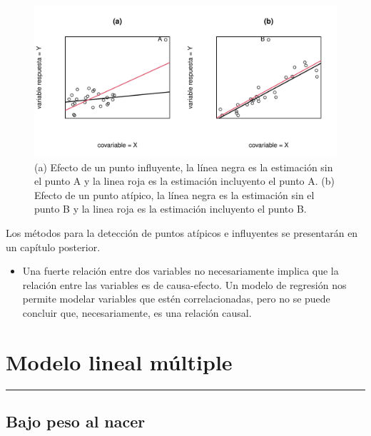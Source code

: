 \documentclass[
]{article}
\providecommand{\tightlist}{%
  \setlength{\itemsep}{0pt}\setlength{\parskip}{0pt}}
\begin{document}
\begin{figure}

{\centering \includegraphics{MLGI_files/figure-latex/influyentes-1} 

}

\caption{(a) Efecto de un punto influyente, la línea negra  es la estimación sin el punto A y la linea roja es la estimación incluyento el punto A. (b) Efecto de un punto atípico, la línea negra  es la estimación sin el punto B y la linea roja es la estimación incluyento el punto B.}\label{fig:influyentes}
\end{figure}

Los métodos para la detección de puntos atípicos e influyentes se presentarán en un capítulo posterior.

\begin{itemize}
\tightlist
\item
  Una fuerte relación entre dos variables no necesariamente implica que la relación entre las variables es de causa-efecto. Un modelo de regresión nos permite modelar variables que estén correlacionadas, pero no se puede concluir que, necesariamente, es una relación causal.
\end{itemize}

\hypertarget{modelo-lineal-muxfaltiple}{%
\section{Modelo lineal múltiple}\label{modelo-lineal-muxfaltiple}}

\rule{\textwidth}{0.4pt}

\hypertarget{bajo-peso-al-nacer}{%
\subsection*{Bajo peso al nacer}\label{bajo-peso-al-nacer}}
\end{document}

